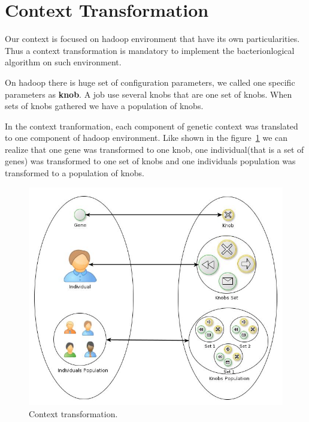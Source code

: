 \section{Context Transformation}
\label{sec:contextTrans}

Our context is focused on hadoop environment that have its own particularities. Thus
a context transformation is mandatory to implement the bacterionlogical algorithm
on such environment.

On hadoop there is huge set of configuration parameters, we called one specific 
parameters as \textbf{knob}. A job use several knobs that are one set of knobs. 
When sets of knobs gathered we have a population of knobs.

In the context tranformation, each component of genetic
context was translated to one component of hadoop environment. Like shown in the
figure~\ref{fig:transformation} we can realize that one gene was transformed to one knob,
one individual(that is a set of genes) was transformed to one set of knobs and
one individuals population was transformed to a population of knobs.

\begin{figure}[htbp]
        \centering
        \includegraphics[width=\columnwidth]{img/transformation.jpg}
        \caption{Context transformation.}\label{fig:transformation}
\end{figure}


